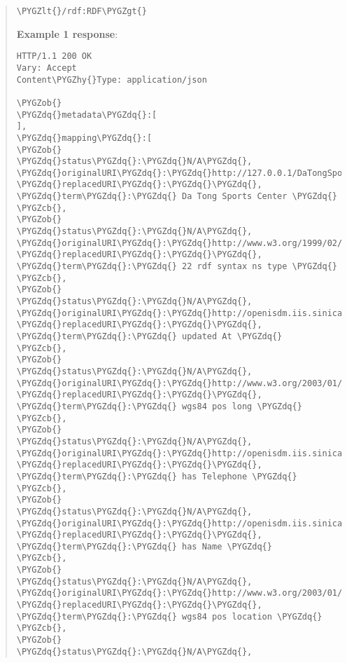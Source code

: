 \documentclass[letterpaper,10pt,english]{sphinxmanual}
\def\PYGZus{\char`\_}
\def\PYGZob{\char`\{}
\def\PYGZcb{\char`\}}
\def\PYGZlt{\char`\<}
\def\PYGZgt{\char`\>}
\def\PYGZsh{\char`\#}
\def\PYGZhy{\char`\-}
\def\PYGZdq{\char`\"}
\begin{document}
\begin{quote}
\begin{description}
\begin{Verbatim}[commandchars=\\\{\}]
 \PYGZlt{}/rdf:RDF\PYGZgt{}
\end{Verbatim}

\end{description}

\textbf{Example 1 response}:

\begin{Verbatim}[commandchars=\\\{\}]
HTTP/1.1 200 OK
Vary: Accept
Content\PYGZhy{}Type: application/json

\PYGZob{}
\PYGZdq{}metadata\PYGZdq{}:[
],
\PYGZdq{}mapping\PYGZdq{}:[
\PYGZob{}
\PYGZdq{}status\PYGZdq{}:\PYGZdq{}N/A\PYGZdq{},
\PYGZdq{}originalURI\PYGZdq{}:\PYGZdq{}http://127.0.0.1/DaTongSportsCenter\PYGZdq{},
\PYGZdq{}replacedURI\PYGZdq{}:\PYGZdq{}\PYGZdq{},
\PYGZdq{}term\PYGZdq{}:\PYGZdq{} Da Tong Sports Center \PYGZdq{}
\PYGZcb{},
\PYGZob{}
\PYGZdq{}status\PYGZdq{}:\PYGZdq{}N/A\PYGZdq{},
\PYGZdq{}originalURI\PYGZdq{}:\PYGZdq{}http://www.w3.org/1999/02/22\PYGZhy{}rdf\PYGZhy{}syntax\PYGZhy{}ns\PYGZsh{}type\PYGZdq{},
\PYGZdq{}replacedURI\PYGZdq{}:\PYGZdq{}\PYGZdq{},
\PYGZdq{}term\PYGZdq{}:\PYGZdq{} 22 rdf syntax ns type \PYGZdq{}
\PYGZcb{},
\PYGZob{}
\PYGZdq{}status\PYGZdq{}:\PYGZdq{}N/A\PYGZdq{},
\PYGZdq{}originalURI\PYGZdq{}:\PYGZdq{}http://openisdm.iis.sinica.edu.tw/VR/updatedAt\PYGZdq{},
\PYGZdq{}replacedURI\PYGZdq{}:\PYGZdq{}\PYGZdq{},
\PYGZdq{}term\PYGZdq{}:\PYGZdq{} updated At \PYGZdq{}
\PYGZcb{},
\PYGZob{}
\PYGZdq{}status\PYGZdq{}:\PYGZdq{}N/A\PYGZdq{},
\PYGZdq{}originalURI\PYGZdq{}:\PYGZdq{}http://www.w3.org/2003/01/geo/wgs84\PYGZus{}pos\PYGZsh{}long\PYGZdq{},
\PYGZdq{}replacedURI\PYGZdq{}:\PYGZdq{}\PYGZdq{},
\PYGZdq{}term\PYGZdq{}:\PYGZdq{} wgs84 pos long \PYGZdq{}
\PYGZcb{},
\PYGZob{}
\PYGZdq{}status\PYGZdq{}:\PYGZdq{}N/A\PYGZdq{},
\PYGZdq{}originalURI\PYGZdq{}:\PYGZdq{}http://openisdm.iis.sinica.edu.tw/VR/hasTelephone\PYGZdq{},
\PYGZdq{}replacedURI\PYGZdq{}:\PYGZdq{}\PYGZdq{},
\PYGZdq{}term\PYGZdq{}:\PYGZdq{} has Telephone \PYGZdq{}
\PYGZcb{},
\PYGZob{}
\PYGZdq{}status\PYGZdq{}:\PYGZdq{}N/A\PYGZdq{},
\PYGZdq{}originalURI\PYGZdq{}:\PYGZdq{}http://openisdm.iis.sinica.edu.tw/VR/hasName\PYGZdq{},
\PYGZdq{}replacedURI\PYGZdq{}:\PYGZdq{}\PYGZdq{},
\PYGZdq{}term\PYGZdq{}:\PYGZdq{} has Name \PYGZdq{}
\PYGZcb{},
\PYGZob{}
\PYGZdq{}status\PYGZdq{}:\PYGZdq{}N/A\PYGZdq{},
\PYGZdq{}originalURI\PYGZdq{}:\PYGZdq{}http://www.w3.org/2003/01/geo/wgs84\PYGZus{}pos\PYGZsh{}location\PYGZdq{},
\PYGZdq{}replacedURI\PYGZdq{}:\PYGZdq{}\PYGZdq{},
\PYGZdq{}term\PYGZdq{}:\PYGZdq{} wgs84 pos location \PYGZdq{}
\PYGZcb{},
\PYGZob{}
\PYGZdq{}status\PYGZdq{}:\PYGZdq{}N/A\PYGZdq{},

\end{Verbatim}
\end{quote}
\end{document}
